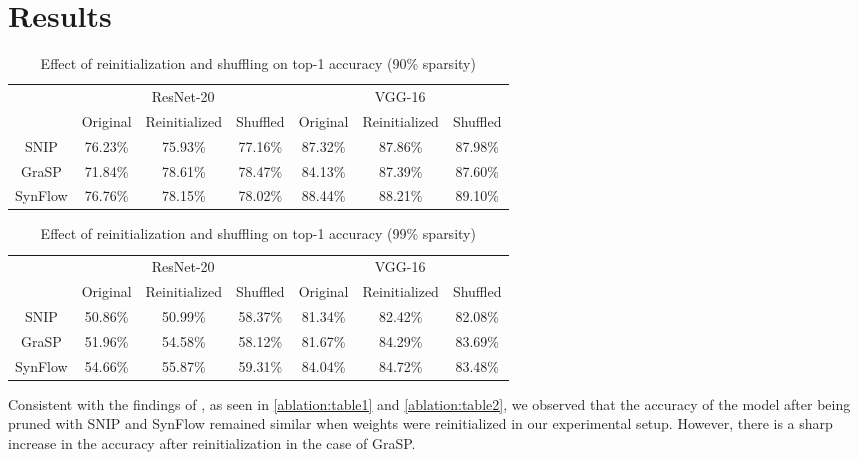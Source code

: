 \section{Results}
\begin{table}[h!]
\centering
\begin{tabular}{|c|ccc|ccc|}
\hline
        & \multicolumn{3}{c|}{ResNet-20}      & \multicolumn{3}{c|}{VGG-16}         \\ \cline{2-7} 
        & Original & Reinitialized & Shuffled & Original & Reinitialized & Shuffled \\ \hline
SNIP    & 76.23\%  & 75.93\%       & 77.16\%  & 87.32\%  & 87.86\%       & 87.98\%  \\ \hline
GraSP   & 71.84\%  & 78.61\%       & 78.47\%  & 84.13\%  & 87.39\%       & 87.60\%  \\ \hline
SynFlow & 76.76\%  & 78.15\%       & 78.02\%  & 88.44\%  & 88.21\%       & 89.10\%  \\ \hline
\end{tabular}
\caption{Effect of reinitialization and shuffling on top-1 accuracy (90\% sparsity)}
\label{ablation:table1}
\end{table}
\newpage
\begin{table}[h!]
\centering
\begin{tabular}{|c|ccc|ccc|}
\hline
        & \multicolumn{3}{c|}{ResNet-20}      & \multicolumn{3}{c|}{VGG-16}         \\ \cline{2-7} 
        & Original & Reinitialized & Shuffled & Original & Reinitialized & Shuffled \\ \hline
SNIP    & 50.86\%  & 50.99\%       & 58.37\%  & 81.34\%  & 82.42\%       & 82.08\%  \\ \hline
GraSP   & 51.96\%  & 54.58\%       & 58.12\%  & 81.67\%  & 84.29\%       & 83.69\%  \\ \hline
SynFlow & 54.66\%  & 55.87\%       & 59.31\%  & 84.04\%  & 84.72\%       & 83.48\%  \\ \hline
\end{tabular}
\caption{Effect of reinitialization and shuffling on top-1 accuracy (99\% sparsity)}
\label{ablation:table2}
\end{table}

Consistent with the findings of \textcite{frankle21}, as seen in \autoref{ablation:table1} and \autoref{ablation:table2}, we observed that the accuracy of the model after being pruned with SNIP and SynFlow remained similar when weights were reinitialized in our experimental setup. However, there is a sharp increase in the accuracy after reinitialization in the case of GraSP.

